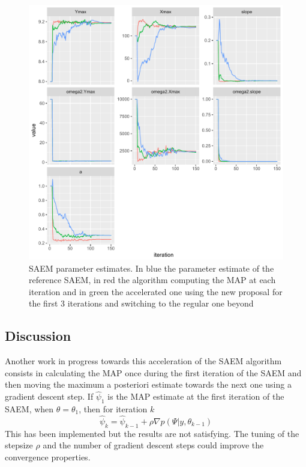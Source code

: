 \documentclass{article}
\begin{document}
\begin{appendices}
\begin{figure}[ht]
\label{RWM_MIX}
\vskip 0.2in
\begin{center}
\centerline{\includegraphics[width=\columnwidth]{map_mix_yield.pdf}}
\caption{SAEM parameter estimates. In blue the parameter estimate of the reference SAEM, in red the algorithm computing the MAP at each iteration and in green the accelerated one using the new proposal for the first 3 iterations and switching to the regular one beyond}
\label{new}
\end{center}
\vskip -0.2in
\end{figure} 

\subsection{Discussion}
Another work in progress towards this acceleration of the SAEM algorithm consists in calculating the MAP once during the first iteration of the SAEM and then moving the maximum a posteriori estimate towards the next one using a gradient descent step. If $\hat{\psi}_1$ is the MAP estimate at the first iteration of the SAEM, when $\theta = \theta_1$, then for iteration $k$
\begin{equation}
\hat{\psi}_k = \hat{\psi}_{k-1} + \rho \nabla p(\Psi | y, \theta_{k-1})
\end{equation}
This has been implemented but the results are not satisfying. The tuning of the stepsize $\rho$ and the number of gradient descent steps could improve the convergence properties.

\end{appendices}
\end{document}
